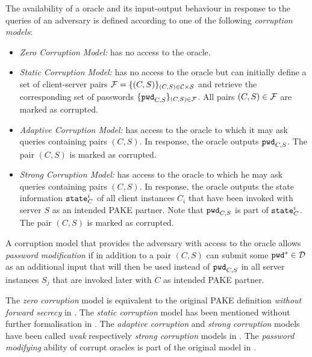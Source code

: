 \begin{definition}\label{def:corrmodels}
The availability of a \Corrupt oracle and its input-output behaviour in response to the queries of an adversary \cA is defined according to one of the following \emph{corruption models}:
\begin{itemize}
	\item\emph{Zero Corruption Model:} \cA has no access to the \Corrupt oracle.
	
	\item\emph{Static Corruption Model:} \cA has no access to the \Corrupt oracle but can initially define a set of client-server pairs $\mathcal{F}=\{(C,S)\}_{(C,S)\in\mathcal{C}\times\mathcal{S}}$ and retrieve the corresponding set of passwords $\{\mathtt{pwd}_{C,S}\}_{(C,S)\in \mathcal{F}}$.
		All pairs $(C,S)\in\mathcal{F}$ are marked as corrupted.
	
	\item\emph{Adaptive Corruption Model:} \cA has access to the \Corrupt oracle to which it may ask queries containing pairs $(C, S)$.
		In response, the oracle outputs $\mathtt{pwd}_{C,S}$. The pair $(C,S)$ is marked as corrupted.
	
	\item\emph{Strong Corruption Model:} \cA has access to the \Corrupt oracle to which he may ask queries containing pairs $(C, S)$.
		In response, the oracle outputs the state information $\mathtt{state}^i_C$ of all client instances $C_i$ that have been invoked with server $S$ as an intended PAKE partner.
			Note that $\mathtt{pwd}_{C,S}$ is part of $\mathtt{state}^i_C$.
			The pair $(C,S)$ is marked as corrupted.
	
\end{itemize}

\noindent
A corruption model that provides the adversary \cA with access to the \Corrupt oracle allows \emph{password modification} if in addition to a pair $(C,S)$ \cA can submit some $\mathtt{pwd}^\ast\in\mathcal{D}$ as an additional input that will then be used instead of $\mathtt{pwd}_{C,S}$ in all server instances $S_j$ that are invoked later with $C$ as intended \ac{PAKE} partner.
\eod
\end{definition}

\noindent
The \emph{zero corruption} model is equivalent to the original PAKE definition \emph{without forward secrecy} in \cite{Bellare2000,Abdalla2005}.
The \emph{static corruption} model has been mentioned without further formalisation in \cite{Abdalla2005,Gennaro2008}.
The \emph{adaptive corruption} and \emph{strong corruption} models have been called \emph{weak} respectively \emph{strong corruption} models in \cite{Bellare2000}.
The \emph{password modifying} ability of corrupt oracles is part of the original model in \cite{Bellare2000}.


